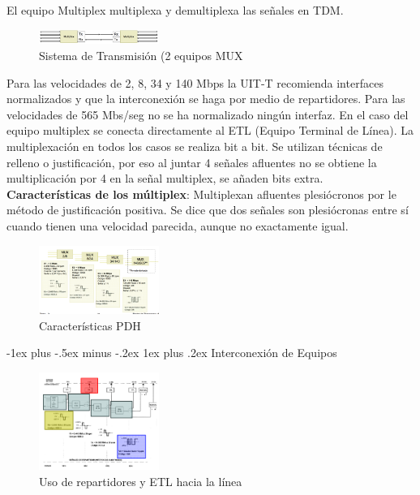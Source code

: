 \documentclass[10pt,portrait, twocolumn]{article}
\makeatletter
\renewcommand{\subsubsection}{\@startsection{subsubsection}{3}{0mm}%
                                {-1ex plus -.5ex minus -.2ex}%
                                {1ex plus .2ex}%
                                {\normalfont\small\bfseries}}
\makeatother
\begin{document}
El equipo Multiplex multiplexa y demultiplexa las señales en TDM. 
  
 \begin{figure}[ht]
	\centering
     \includegraphics[width=0.35\textwidth]{SdT}
      \caption{Sistema de Transmisión (2 equipos MUX}
      \label{fig:Regiones de frecuencias}
  \end{figure}
  
Para las velocidades de 2, 8, 34 y 140 Mbps la UIT-T recomienda interfaces normalizados y que la interconexión se haga por medio de repartidores. Para las velocidades de 565 Mbs/seg no se ha normalizado ningún interfaz. En el caso del equipo multiplex se conecta directamente al ETL (Equipo Terminal de Línea). La multiplexación en todos los casos se realiza bit a bit. Se utilizan técnicas de relleno o justificación, por eso al juntar 4 señales afluentes no se obtiene la multiplicación por 4 en la señal multiplex, se añaden bits extra.\\

\textbf{Características de los múltiplex}: Multiplexan afluentes plesiócronos por le método de justificación positiva. Se dice que dos señales son plesiócronas entre sí cuando tienen una velocidad parecida, aunque no exactamente igual.

\begin{figure}[h]
	\centering
     \includegraphics[width=0.35\textwidth]{CaracPDH}
      \caption{Características PDH}
      \label{fig:Regiones de frecuencias}
  \end{figure}
  
\subsubsection{Interconexión de Equipos}

\begin{figure}[!ht]
	\centering
     \includegraphics[width=0.35\textwidth]{ETL}
      \caption{Uso de repartidores y ETL hacia la línea}
      \label{fig:Regiones de frecuencias}
  \end{figure}
\end{document}
